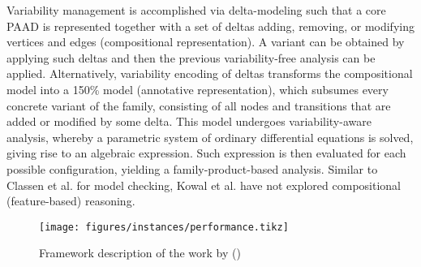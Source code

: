 Variability management is accomplished via delta-modeling such that a core PAAD is represented together with a set 
of deltas adding, removing, or modifying vertices and edges (compositional representation). A variant can be obtained 
by applying such deltas and then the previous variability-free analysis can be applied. Alternatively, variability 
encoding of deltas transforms the compositional model into a 150\% model (annotative representation), which subsumes every concrete variant of the family, consisting of all nodes and transitions that are 
added or modified by some delta.
This model undergoes variability-aware analysis, whereby a parametric\footnotemark{} system of ordinary differential equations 
is solved, giving rise to an algebraic expression.
Such expression is then evaluated for each possible configuration, yielding a family-product-based analysis.
Similar to Classen et al. for model checking, Kowal et al. have not explored compositional (feature-based) reasoning.

\begin{figure}[!htbp]
	\centering
        \texttt{[image: figures/instances/performance.tikz]}
	\caption{Framework description of the work by \citet{kowal_scaling_2015} ()}
	\label{fig:instance-performance}
\end{figure}







